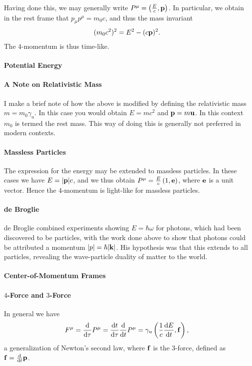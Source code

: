 Having done this, we may generally write $P^{\mu} = \left(\frac{E}{c}, \vb{p}\right)$. In particular, we obtain in the rest frame that $p_{\mu}p^{\mu} = m_{0}c$, and thus the mass invariant
\begin{align*}
	(m_{0}c^{2})^{2} = E^{2} - (c\vb{p})^{2}.
\end{align*}
The $4$-momentum is thus time-like.

\paragraph{Potential Energy}

\paragraph{A Note on Relativistic Mass}
I make a brief note of how the above is modified by defining the relativistic mass $m = m_{0}\gamma_{u}$. In this case you would obtain $E = mc^{2}$ and $\vb{p} = m\vb{u}$. In this context $m_{0}$ is termed the rest mass. This way of doing this is generally not preferred in modern contexts.

\paragraph{Massless Particles}
The expression for the energy may be extended to massless particles. In these cases we have $E = \abs{\vb{p}}c$, and we thus obtain $P^{\mu} = \frac{E}{c}\left(1, \vb{e}\right)$, where $\vb{e}$ is a unit vector. Hence the $4$-momentum is light-like for massless particles.

\paragraph{de Broglie}
de Broglie combined experiments showing $E = \hbar\omega$ for photons, which had been discovered to be particles, with the work done above to show that photons could be attributed a momentum $\abs{p} = \hbar\abs{\vb{k}}$. His hypothesis was that this extends to all particles, revealing the wave-particle duality of matter to the world.

\paragraph{Center-of-Momentum Frames}

\paragraph{$4$-Force and $3$-Force}
In general we have
\begin{align*}
	F^{\mu} = \dv{\tau}P^{\mu} = \dv{t}{\tau}\dv{t}P^{\mu} = \gamma_{u}\left(\frac{1}{c}\dv{E}{t}, \vb{f}\right),
\end{align*}
a generalization of Newton's second law, where $\vb{f}$ is the $3$-force, defined as $\vb{f} = \dv{t}\vb{p}$.

